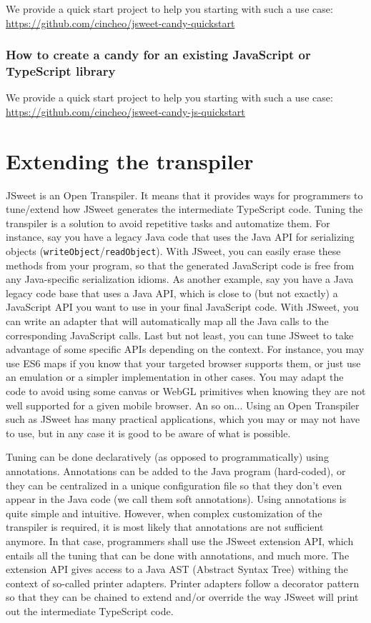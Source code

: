 \documentclass[a4paper]{report}
\begin{document}
We provide a quick start project to help you starting with such a use case: \url{https://github.com/cincheo/jsweet-candy-quickstart}

\subsection{How to create a candy for an existing JavaScript or TypeScript library}

We provide a quick start project to help you starting with such a use case: \url{https://github.com/cincheo/jsweet-candy-js-quickstart}

\chapter{Extending the transpiler}
\label{extension}

JSweet is an Open Transpiler. It means that it provides ways for programmers to tune/extend how JSweet generates the intermediate TypeScript code. Tuning the transpiler is a solution to avoid repetitive tasks and automatize them. For instance, say you have a legacy Java code that uses the Java API for serializing objects (\texttt{writeObject}/\texttt{readObject}). With JSweet, you can easily erase these methods from your program, so that the generated JavaScript code is free from any Java-specific serialization idioms. As another example, say you have a Java legacy code base that uses a Java API, which is close to (but not exactly) a JavaScript API you want to use in your final JavaScript code. With JSweet, you can write an adapter that will automatically map all the Java calls to the corresponding JavaScript calls. Last but not least, you can tune JSweet to take advantage of some specific APIs depending on the context. For instance, you may use ES6 maps if you know that your targeted browser supports them, or just use an emulation or a simpler implementation in other cases. You may adapt the code to avoid using some canvas or WebGL primitives when knowing they are not well supported for a given mobile browser. An so on... Using an Open Transpiler such as JSweet has many practical applications, which you may or may not have to use, but in any case it is good to be aware of what is possible.

Tuning can be done declaratively (as opposed to programmatically) using annotations. Annotations can be added to the Java program (hard-coded), or they can be centralized in a unique configuration file so that they don't even appear in the Java code (we call them soft annotations). Using annotations is quite simple and intuitive. However, when complex customization of the transpiler is required, it is most likely that annotations are not sufficient anymore. In that case, programmers shall use the JSweet extension API, which entails all the tuning that can be done with annotations, and much more. The extension API gives access to a Java AST (Abstract Syntax Tree) withing the context of so-called printer adapters. Printer adapters follow a decorator pattern so that they can be chained to extend and/or override the way JSweet will print out the intermediate TypeScript code.
\end{document}
